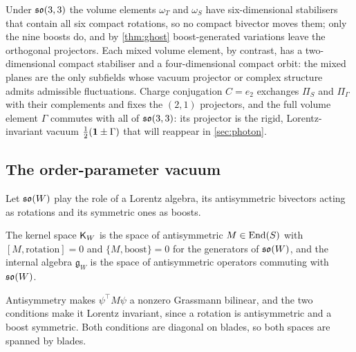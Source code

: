 Under $\mathfrak{so}(3,3)$ the volume elements $\omega_T$ and $\omega_S$ have six-dimensional stabilisers that contain all six compact rotations, so no
compact bivector moves them; only the nine boosts do, and by \cref{thm:ghost} boost-generated variations leave the orthogonal projectors.
Each mixed volume element, by contrast, has a two-dimensional compact stabiliser and a four-dimensional compact orbit: the mixed planes are
the only subfields whose vacuum projector or complex structure admits admissible fluctuations. Charge conjugation $C=e_2$ exchanges $\Pi_S$
and $\Pi_\Gamma$ with their complements and fixes the $(2,1)$ projectors, and the full volume element $\Gamma$ commutes with all of $\mathfrak{so}(3,3)$:
its projector is the rigid, Lorentz-invariant vacuum $\tfrac12(\mathbf 1\pm\Gamma)$ that will reappear in \cref{sec:photon}.

\subsection{The order-parameter vacuum}

Let $\mathfrak{so}(W)$ play the role of a Lorentz algebra, its antisymmetric bivectors acting as rotations and its symmetric ones as boosts.

\begin{definition}
\label{def:subkernel}
The kernel space $\mathsf K_W$ is the space of antisymmetric $M\in\operatorname{End}(S)$ with $[M,\text{rotation}]=0$ and $\{M,\text{boost}\}=0$ for the generators of
$\mathfrak{so}(W)$, and the internal algebra $\mathfrak g_W$ is the space of antisymmetric operators commuting with $\mathfrak{so}(W)$.
\end{definition}

Antisymmetry makes $\psi^{\!\top}M\psi$ a nonzero Grassmann bilinear, and the two conditions make it Lorentz invariant, since a rotation is
antisymmetric and a boost symmetric. Both conditions are diagonal on blades, so both spaces are spanned by blades.

